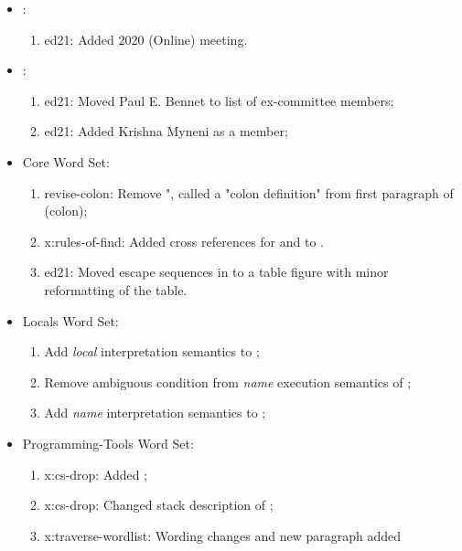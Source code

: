 
	\begin{itemize}
	\item {}:						%
		\begin{enumerate}
			\item \textsf{ed21}: Added 2020 (Online) meeting.
		\end{enumerate}
	\item {}:					%
		\begin{enumerate}
			\item \textsf{ed21}: Moved Paul E. Bennet to list of ex-committee members;
			\item \textsf{ed21}: Added Krishna Myneni as a member;
		\end{enumerate}
	\item[6] Core Word Set:					%
		\begin{enumerate}
		\item \textsf{revise-colon}: Remove ", called a "colon definition" from
			first paragraph of  (colon);
		\item \textsf{x:rules-of-find}: Added cross references for
			 and 
			to .
		\item \textsf{ed21}: Moved escape sequences in  to a table
			figure with minor reformatting of the table.
		\end{enumerate}
	\item[13] Locals Word Set:				%
		\begin{enumerate}
		\item Add \emph{local} interpretation semantics to ;
		\item Remove ambiguous condition from \emph{name} execution semantics of ;
		\item Add \emph{name} interpretation semantics to ;
		\end{enumerate}
	\item[15] Programming-Tools Word Set:	%
		\begin{enumerate}
		\item \textsf{x:cs-drop}: Added ;
		\item \textsf{x:cs-drop}: Changed stack description of ;
		\item \textsf{x:traverse-wordlist}: Wording changes and new paragraph added

\end{enumerate}
\end{itemize}
